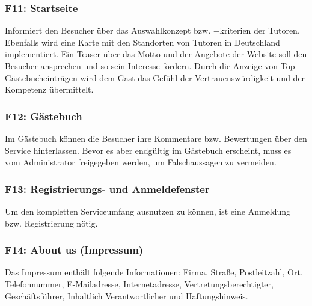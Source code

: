 \documentclass[10pt,a4paper]{scrartcl}
\begin{document}
\subsubsection*{F11: Startseite}

Informiert den Besucher über das Auswahlkonzept bzw. $-$kriterien der Tutoren. Ebenfalls wird eine Karte mit den Standorten von Tutoren in Deutschland implementiert. Ein Teaser über das Motto und der Angebote der Website soll den Besucher ansprechen und so sein Interesse fördern. Durch die Anzeige von Top Gästebucheinträgen wird dem Gast das Gefühl der Vertrauenswürdigkeit und der Kompetenz übermittelt.

\subsubsection*{F12: Gästebuch}

Im Gästebuch können die Besucher ihre Kommentare bzw. Bewertungen über den Service hinterlassen. Bevor es aber endgültig im Gästebuch erscheint, muss es vom Administrator freigegeben werden, um Falschaussagen zu vermeiden.


%

\subsubsection*{F13: Registrierungs- und Anmeldefenster}

Um den kompletten Serviceumfang ausnutzen zu können, ist eine Anmeldung bzw. Registrierung nötig.

\subsubsection*{F14: About us (Impressum)}

Das Impressum enthält folgende Informationen: Firma, Straße, Postleitzahl, Ort, Telefonnummer, E-Mailadresse, Internetadresse, Vertretungsberechtigter, \\ Geschäftsführer, Inhaltlich Verantwortlicher und Haftungshinweis.
\end{document}
